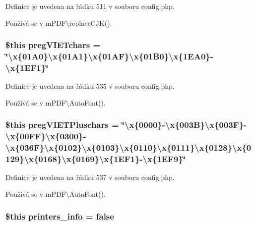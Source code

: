 Definice je uvedena na řádku 511 v souboru config.\-php.



Používá se v m\-P\-D\-F\textbackslash{}replace\-C\-J\-K().

\hypertarget{config_8php_abf298b1fd6e2145eed3407854d7de48e}{
\subsubsection[{preg\-V\-I\-E\-Tchars}]{\setlength{\rightskip}{0pt plus 5cm}\$this preg\-V\-I\-E\-Tchars = \char`\"{}\textbackslash{}x\{01\-A0\}\textbackslash{}x\{01\-A1\}\textbackslash{}x\{01\-A\-F\}\textbackslash{}x\{01\-B0\}\textbackslash{}x\{1\-E\-A0\}-\/\textbackslash{}x\{1\-E\-F1\}\char`\"{}}}\label{config_8php_abf298b1fd6e2145eed3407854d7de48e}


Definice je uvedena na řádku 535 v souboru config.\-php.



Používá se v m\-P\-D\-F\textbackslash{}\-Auto\-Font().

\hypertarget{config_8php_a7ec8c8e00ca6c33fbbcc0a501b985425}{
\subsubsection[{preg\-V\-I\-E\-T\-Pluschars}]{\setlength{\rightskip}{0pt plus 5cm}\$this preg\-V\-I\-E\-T\-Pluschars = \char`\"{}\textbackslash{}x\{0000\}-\/\textbackslash{}x\{003\-B\}\textbackslash{}x\{003\-F\}-\/\textbackslash{}x\{00\-F\-F\}\textbackslash{}x\{0300\}-\/\textbackslash{}x\{036\-F\}\textbackslash{}x\{0102\}\textbackslash{}x\{0103\}\textbackslash{}x\{0110\}\textbackslash{}x\{0111\}\textbackslash{}x\{0128\}\textbackslash{}x\{0129\}\textbackslash{}x\{0168\}\textbackslash{}x\{0169\}\textbackslash{}x\{1\-E\-F1\}-\/\textbackslash{}x\{1\-E\-F9\}\char`\"{}}}\label{config_8php_a7ec8c8e00ca6c33fbbcc0a501b985425}


Definice je uvedena na řádku 537 v souboru config.\-php.



Používá se v m\-P\-D\-F\textbackslash{}\-Auto\-Font().

\hypertarget{config_8php_a56c54d0593579c1b3e71753ca9dc12c2}{
\subsubsection[{printers\-\_\-info}]{\setlength{\rightskip}{0pt plus 5cm}\$this printers\-\_\-info = {\bf false}}}\label{config_8php_a56c54d0593579c1b3e71753ca9dc12c2}



